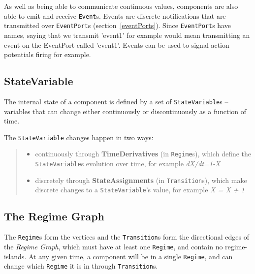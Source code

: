 \documentclass{article}
\begin{document}
As well as being able to communicate continuous values, components are also
able to emit and receive {\tt Event}s. Events are discrete notifications
that are transmitted over {\tt EventPort}s (section~\ref{eventPorts}). Since
{\tt EventPort}s have names, saying that we transmit 'event1' for example
would mean transmitting an event on the EventPort called 'event1'. Events
can be used to signal action potentials firing for example.

\subsection{StateVariable}
\label{state-var}

The internal state of a component is defined by a set of {\tt StateVariable}s
-- variables that can change either continuously or discontinuously as a
function of time.

The {\tt StateVariable} changes happen in two ways:
%
\begin{quote}
\begin{itemize}
\item continuously through \textbf{TimeDerivatives} (in {\tt Regime}s),
which define the {\tt StateVariable}s evolution over time, for example
\textsl{dX/dt=1-X}
\item discretely through \textbf{StateAssignments} (in {\tt Transition}s),
which make discrete changes to a {\tt StateVariable}'s value, for example
\textsl{X = X + 1}
\end{itemize}
\end{quote}

\subsection{The Regime Graph}
\label{regime-graph}

The {\tt Regime}s form the vertices and the {\tt Transition}s form the
directional edges of the \emph{Regime Graph}, which must have at least one
{\tt Regime}, and contain no regime-islands.  At any given time, a
component will be in a single {\tt Regime}, and can change which
{\tt Regime} it is in through {\tt Transition}s.
\end{document}
